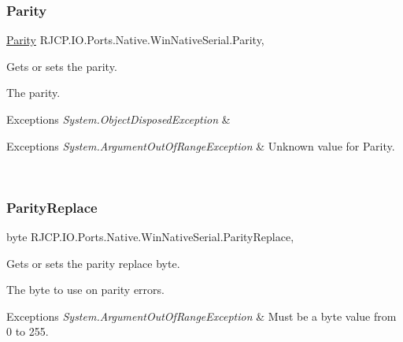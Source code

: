 \subsubsection{\texorpdfstring{Parity}{Parity}}
{\footnotesize\ttfamily \mbox{\hyperlink{namespace_r_j_c_p_1_1_i_o_1_1_ports_a35c8c760a80dd0392e605dd3ad169954}{Parity}} R\+J\+C\+P.\+I\+O.\+Ports.\+Native.\+Win\+Native\+Serial.\+Parity\hspace{0.3cm}{\ttfamily [get]}, {\ttfamily [set]}}



Gets or sets the parity. 

The parity. 


\begin{DoxyExceptions}{Exceptions}
{\em System.\+Object\+Disposed\+Exception} & 
\begin{DoxyExceptions}{Exceptions}
{\em System.\+Argument\+Out\+Of\+Range\+Exception} & Unknown value for Parity.\\
\hline
\end{DoxyExceptions}
\\
\hline
\end{DoxyExceptions}
\mbox{\label{class_r_j_c_p_1_1_i_o_1_1_ports_1_1_native_1_1_win_native_serial_a51bde1eff52dc341d76923bc0b06ac48}} 
\subsubsection{\texorpdfstring{ParityReplace}{ParityReplace}}
{\footnotesize\ttfamily byte R\+J\+C\+P.\+I\+O.\+Ports.\+Native.\+Win\+Native\+Serial.\+Parity\+Replace\hspace{0.3cm}{\ttfamily [get]}, {\ttfamily [set]}}



Gets or sets the parity replace byte. 

The byte to use on parity errors. 


\begin{DoxyExceptions}{Exceptions}
{\em System.\+Argument\+Out\+Of\+Range\+Exception} & Must be a byte value from 0 to 255.\\
\hline
\end{DoxyExceptions}
\mbox{\label{class_r_j_c_p_1_1_i_o_1_1_ports_1_1_native_1_1_win_native_serial_a4c6f1a987cf89e84721d484d1c702070}} 
